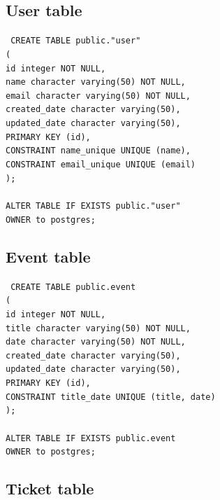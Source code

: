 \subsection{User table}\label{subsec:user-table}

\texttt{
    CREATE TABLE public."user" \\
    ( \\
    id integer NOT NULL, \\
    name character varying(50) NOT NULL, \\
    email character varying(50) NOT NULL, \\
    created\_date character varying(50), \\
    updated\_date character varying(50), \\
    PRIMARY KEY (id), \\
    CONSTRAINT name\_unique UNIQUE (name), \\
    CONSTRAINT email\_unique UNIQUE (email) \\
    ); \\
    \\
    ALTER TABLE IF EXISTS public."user" \\
    OWNER to postgres; \\
}

\subsection{Event table}\label{subsec:event-table}

\texttt{
    CREATE TABLE public.event \\
    ( \\
    id integer NOT NULL,\\
    title character varying(50) NOT NULL,\\
    date character varying(50) NOT NULL,\\
    created\_date character varying(50),\\
    updated\_date character varying(50),\\
    PRIMARY KEY (id),\\
    CONSTRAINT title\_date UNIQUE (title, date)\\
    );\\
    \\
    ALTER TABLE IF EXISTS public.event\\
    OWNER to postgres;\\
}

\subsection{Ticket table}\label{subsec:ticket-table}


